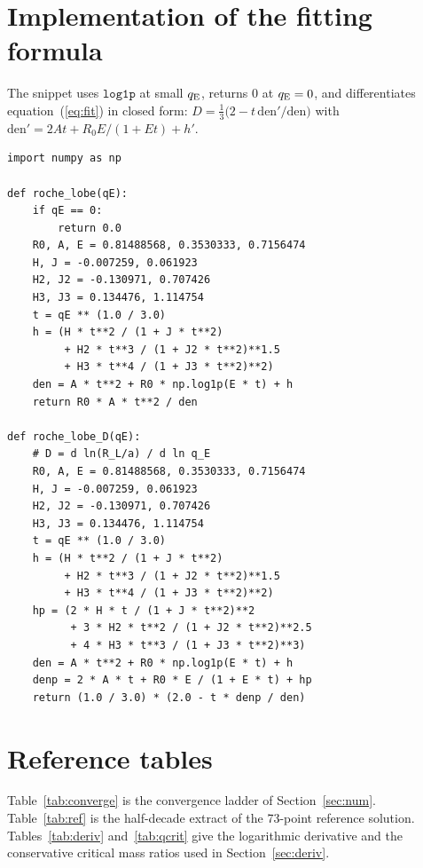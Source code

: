 \documentclass[twocolumn]{aastex702}
\newcommand{\qE}{q_{\rm E}}
\begin{document}
\onecolumngrid
\section{Implementation of the fitting formula}\label{app:code}

The snippet uses $\mathtt{log1p}$ at small $\qE$, returns $0$ at $\qE=0$, and differentiates equation~(\ref{eq:fit}) in closed form: $D=\tfrac13\bigl(2-t\,\mathrm{den}'/\mathrm{den}\bigr)$ with $\mathrm{den}'=2At+R_0E/(1+Et)+h'$.

\begin{verbatim}
import numpy as np

def roche_lobe(qE):
    if qE == 0:
        return 0.0
    R0, A, E = 0.81488568, 0.3530333, 0.7156474
    H, J = -0.007259, 0.061923
    H2, J2 = -0.130971, 0.707426
    H3, J3 = 0.134476, 1.114754
    t = qE ** (1.0 / 3.0)
    h = (H * t**2 / (1 + J * t**2)
         + H2 * t**3 / (1 + J2 * t**2)**1.5
         + H3 * t**4 / (1 + J3 * t**2)**2)
    den = A * t**2 + R0 * np.log1p(E * t) + h
    return R0 * A * t**2 / den

def roche_lobe_D(qE):
    # D = d ln(R_L/a) / d ln q_E
    R0, A, E = 0.81488568, 0.3530333, 0.7156474
    H, J = -0.007259, 0.061923
    H2, J2 = -0.130971, 0.707426
    H3, J3 = 0.134476, 1.114754
    t = qE ** (1.0 / 3.0)
    h = (H * t**2 / (1 + J * t**2)
         + H2 * t**3 / (1 + J2 * t**2)**1.5
         + H3 * t**4 / (1 + J3 * t**2)**2)
    hp = (2 * H * t / (1 + J * t**2)**2
          + 3 * H2 * t**2 / (1 + J2 * t**2)**2.5
          + 4 * H3 * t**3 / (1 + J3 * t**2)**3)
    den = A * t**2 + R0 * np.log1p(E * t) + h
    denp = 2 * A * t + R0 * E / (1 + E * t) + hp
    return (1.0 / 3.0) * (2.0 - t * denp / den)
\end{verbatim}

\section{Reference tables}\label{app:tables}

Table~\ref{tab:converge} is the convergence ladder of Section~\ref{sec:num}. Table~\ref{tab:ref} is the half-decade extract of the 73-point reference solution. Tables~\ref{tab:deriv} and~\ref{tab:qcrit} give the logarithmic derivative and the conservative critical mass ratios used in Section~\ref{sec:deriv}.
\end{document}
